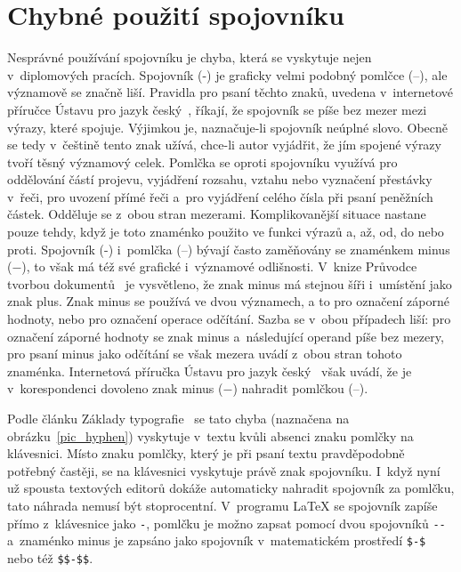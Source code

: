\section{Chybné použití spojovníku}
Nesprávné používání spojovníku je chyba, která se vyskytuje nejen v~diplomových
pracích. Spojovník (-) je graficky velmi podobný pomlčce (--), ale významově
se značně liší. Pravidla pro psaní těchto znaků, uvedena v~internetové příručce
Ústavu pro jazyk český~\cite[Cesta: \emph{Pravopis\,--\,interpunkce}~>~\emph{Spojovník} a~\emph{Pravopis\,--\,interpunkce}~>~\emph{Pomlčka}]{Ustav_pro_jazyk_cesky},
říkají, že spojovník se píše bez mezer mezi výrazy, které spojuje. Výjimkou
je, naznačuje-li spojovník neúplné slovo. Obecně se tedy v~češtině tento znak
užívá, chce-li autor vyjádřit, že jím spojené výrazy tvoří těsný významový
celek. Pomlčka se oproti spojovníku využívá pro oddělování částí projevu,
vyjádření rozsahu, vztahu nebo vyznačení přestávky v~řeči, pro uvození
přímé řeči a~pro vyjádření celého čísla při psaní peněžních částek.
Odděluje se z~obou stran mezerami. Komplikovanější situace nastane pouze
tehdy, když je toto znaménko použito ve funkci výrazů a, až, od, do nebo proti.
Spojovník (-) i~pomlčka (--) bývají často zaměňovány se znaménkem minus ($-$),
to však má též své grafické i~významové odlišnosti.
V~knize Průvodce tvorbou dokumentů~\cite[k.~19.24, s.~148--149]{Pruvodce_tvorbou_dokumentu}
je vysvětleno, že znak minus má stejnou
šíři i~umístění jako znak plus. Znak minus se používá ve dvou významech, a to
pro označení záporné hodnoty, nebo pro označení operace odčítání. Sazba se v~obou
případech liší: pro označení záporné hodnoty se znak minus a~následující
operand píše bez mezery, pro psaní minus jako odčítání se však mezera uvádí
z~obou stran tohoto znaménka. Internetová příručka Ústavu pro jazyk
český~\cite[Cesta: \emph{Pravopis\,--\,interpunkce}~>~\emph{Pomlčka}]{Ustav_pro_jazyk_cesky} 
však uvádí, že je v~korespondenci dovoleno
znak minus ($-$) nahradit pomlčkou (--).

Podle článku Základy typografie~\cite{Zaklady_typografie:Slezakova} se tato chyba (naznačena na
obrázku~\ref{pic_hyphen}) vyskytuje v~textu kvůli absenci znaku pomlčky na klávesnici.
Místo znaku pomlčky, který je při psaní textu pravděpodobně potřebný častěji,
se na klávesnici vyskytuje právě znak spojovníku. I~když nyní už spousta
textových editorů dokáže automaticky nahradit spojovník za pomlčku, tato náhrada
nemusí být stoprocentní. V~programu {\LaTeX} se spojovník zapíše přímo
z~klávesnice jako \verb|-|,
pomlčku je možno zapsat pomocí dvou spojovníků \verb|--| a~znaménko minus je
zapsáno jako spojovník v~matematickém prostředí \verb|$-$| nebo též \verb|$$-$$|.

